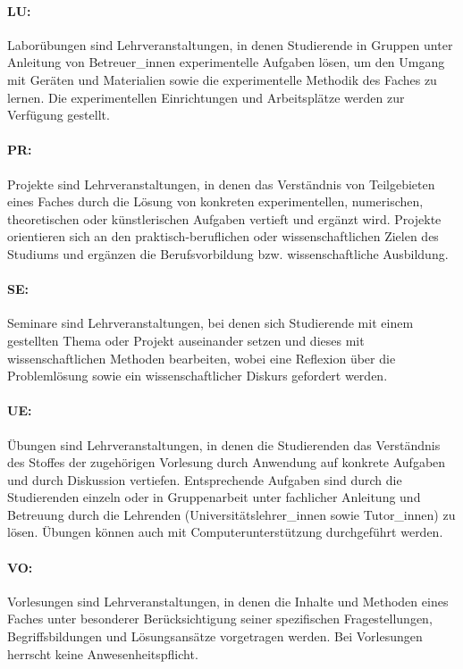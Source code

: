 \paragraph{LU:} Laborübungen sind Lehrveranstaltungen, in denen
Studierende in Gruppen unter Anleitung von Betreuer\_innen 
experimentelle Aufgaben lösen, um den Umgang mit Geräten und
Materialien sowie die experimentelle Methodik des Faches zu
lernen. Die experimentellen Einrichtungen und Arbeitsplätze werden zur
Verfügung gestellt.

\paragraph{PR:} Projekte sind Lehrveranstaltungen, in denen das
Verständnis von Teilgebieten eines Faches durch die Lösung von
konkreten experimentellen, numerischen, theoretischen oder
künstlerischen Aufgaben vertieft und ergänzt wird. Projekte
orientieren sich an den praktisch-beruflichen oder wissenschaftlichen
Zielen des Studiums und ergänzen die Berufsvorbildung
bzw. wissenschaftliche Ausbildung.

\paragraph{SE:} Seminare sind Lehrveranstaltungen, bei denen sich
Studierende mit einem gestellten Thema oder Projekt auseinander setzen
und dieses mit wissenschaftlichen Methoden bearbeiten, wobei eine
Reflexion über die Problemlösung sowie ein wissenschaftlicher Diskurs
gefordert werden.

\paragraph{UE:} Übungen sind Lehrveranstaltungen, in denen die
Studierenden das Verständnis des Stoffes der zugehörigen Vorlesung
durch Anwendung auf konkrete Aufgaben und durch Diskussion
vertiefen. Entsprechende Aufgaben sind durch die Studierenden einzeln
oder in Gruppenarbeit unter fachlicher Anleitung und Betreuung durch
die Lehrenden (Universitätslehrer\_innen sowie Tutor\_innen) zu lösen.
Übungen können auch mit Computerunterstützung durchgeführt werden.

\paragraph{VO:} Vorlesungen sind Lehrveranstaltungen, in denen die
Inhalte und Methoden eines Faches unter besonderer Berücksichtigung
seiner spezifischen Fragestellungen, Begriffsbildungen und
Lösungsansätze vorgetragen werden. Bei Vorlesungen herrscht keine
Anwesenheitspflicht.

